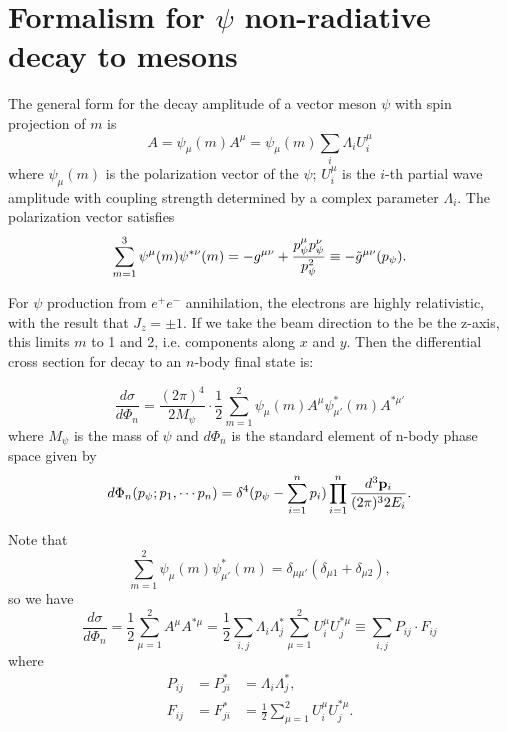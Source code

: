\section{Formalism for $\psi$ non-radiative decay to mesons}
The general form for the decay amplitude of a vector meson $\psi$
with spin projection of $m$ is
\begin{equation}
A=\psi_\mu(m)A^\mu=\psi_\mu(m)\sum_i\Lambda_i U_i^{\mu}
\end{equation}
where $\psi_\mu(m)$ is the polarization vector of the $\psi$;
$U_i^{\mu}$ is the $i$-th partial wave amplitude with coupling
strength determined by a complex parameter $\Lambda_i$. The
polarization vector satisfies
\begin{equation}
\sum_{m=1}^3\psi^\mu(m)\psi^{*\nu}(m)= -g^{\mu\nu}+{p_\psi^\mu
p_\psi^\nu\over p_\psi^2}\equiv -\tilde
g^{\mu\nu}(p_\psi).
\end{equation}

For $\psi$ production from $e^+ e^-$ annihilation, the electrons
are highly relativistic, with the result that $J_z = \pm 1$. If we
take the beam direction to the be the z-axis, this limits $m$ to 1
and 2, i.e. components along $x$ and $y$. Then the differential
cross section for decay to an $n$-body final state is:

\begin{equation}
\frac{d\sigma}{d\Phi_n} =
\frac{(2\pi)^4}{2M_\psi}\cdot\frac{1}{2}\sum^2_{m=1} \psi_{\mu}(m)
A^{\mu}\psi^*_{\mu'}(m) A^{*\mu'}
\end{equation}
where $M_\psi$ is the mass of $\psi$ and $d\Phi_n$ is the standard
element of n-body phase space given by
\begin{equation}
d\Phi_n(p_\psi; p_1, \cdots p_n)=\delta^4(p_\psi-\sum^n_{i=1}p_i)
\prod^n_{i=1}\frac{d^3{\bf p}_i}{(2\pi)^32E_i}.
\end{equation}

Note that
\begin{equation}
\sum^2_{m=1}\psi_{\mu}(m)\psi^*_{\mu'}(m)
=\delta_{\mu\mu'}(\delta_{\mu 1}+\delta_{\mu 2}),
\end{equation}
so we have
\begin{equation}
\frac{d\sigma}{d\Phi_n} = \frac{1}{2}\sum^2_{\mu=1}A^{\mu}A^{*\mu}
= \frac{1}{2}\sum_{i,j}\Lambda_i\Lambda_j^*\sum^2_{\mu=1}
U_i^{\mu}U_j^{*\mu}
 \equiv \sum_{i,j}P_{ij}\cdot F_{ij}
\end{equation}
where
\begin{eqnarray}
P_{ij} &= P^*_{ji} &= \Lambda_i\Lambda^*_j, \\
F_{ij} &= F^*_{ji} &= \frac{1}{2}\sum^2_{\mu=1}
U_i^{\mu}U_j^{*\mu}.
\end{eqnarray}

